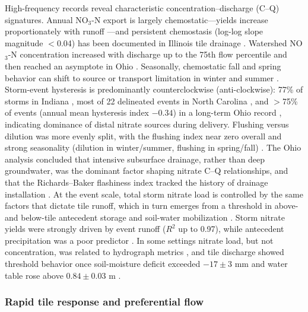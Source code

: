 \documentclass[11pt]{article}
\begin{document}
High-frequency records reveal characteristic concentration--discharge (C--Q) signatures. Annual NO$_3$-N export is largely chemostatic---yields increase proportionately with runoff \parencite{Speir2021}---and persistent chemostasis (log-log slope magnitude $<$0.04) has been documented in Illinois tile drainage \parencite{Hu2024}. Watershed NO$_3$-N concentration increased with discharge up to the 75th flow percentile and then reached an asymptote in Ohio \parencite{Williams2015}. Seasonally, chemostatic fall and spring behavior can shift to source or transport limitation in winter and summer \parencite{Speir2021}. Storm-event hysteresis is predominantly counterclockwise (anti-clockwise): 77\% of storms in Indiana \parencite{Speir2021}, most of 22 delineated events in North Carolina \parencite{Liu2020}, and $>$75\% of events (annual mean hysteresis index $-0.34$) in a long-term Ohio record \parencite{Liu2022b}, indicating dominance of distal nitrate sources during delivery. Flushing versus dilution was more evenly split, with the flushing index near zero overall and strong seasonality (dilution in winter/summer, flushing in spring/fall) \parencite{Liu2022b,Speir2021}. The Ohio analysis concluded that intensive subsurface drainage, rather than deep groundwater, was the dominant factor shaping nitrate C--Q relationships, and that the Richards--Baker flashiness index tracked the history of drainage installation \parencite{Liu2022b}. At the event scale, total storm nitrate load is controlled by the same factors that dictate tile runoff, which in turn emerges from a threshold in above- and below-tile antecedent storage and soil-water mobilization \parencite{Cain2022}. Storm nitrate yields were strongly driven by event runoff ($R^2$ up to 0.97), while antecedent precipitation was a poor predictor \parencite{Speir2021}. In some settings nitrate load, but not concentration, was related to hydrograph metrics \parencite{Williams2022}, and tile discharge showed threshold behavior once soil-moisture deficit exceeded $-17\pm3$ mm and water table rose above $0.84\pm0.03$ m \parencite{Williams2022}.

\subsubsection{Rapid tile response and preferential flow}
\end{document}
